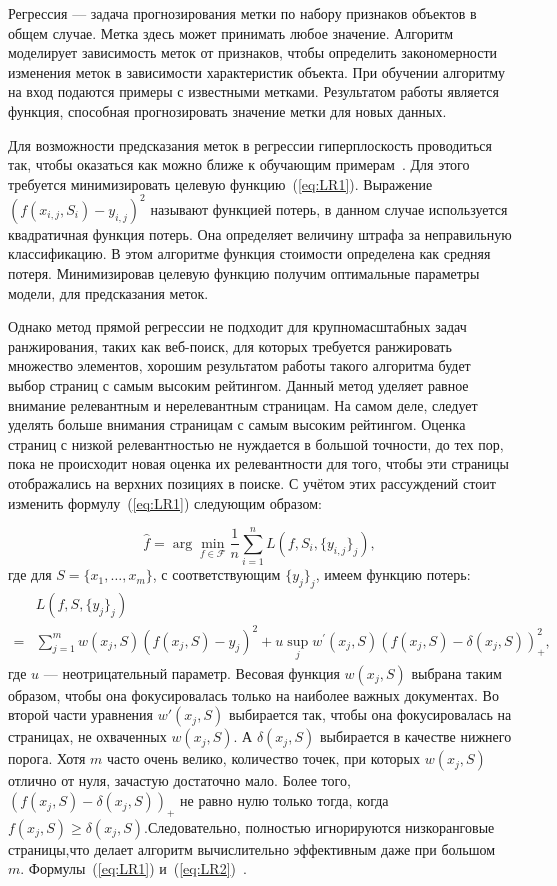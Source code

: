 Регрессия --- задача прогнозирования метки по набору признаков объектов в общем случае. Метка здесь может принимать любое значение. Алгоритм моделирует зависимость меток от признаков, чтобы определить закономерности изменения меток в зависимости характеристик объекта. При обучении алгоритму на вход подаются примеры с известными метками. Результатом работы является функция, способная прогнозировать значение метки для новых данных. 

Для возможности предсказания меток в регрессии гиперплоскость проводиться так, чтобы оказаться как можно ближе к обучающим примерам~\cite{ML_no_wors}. Для этого требуется минимизировать целевую функцию~(\ref{eq:LR1}). Выражение \\$(f(x_{i, j}, S_i)-y_{i, j})^2$ называют функцией потерь, в данном случае используется квадратичная функция потерь. Она определяет величину штрафа за неправильную классификацию. В этом алгоритме функция стоимости определена как средняя потеря. Минимизировав целевую функцию получим оптимальные параметры модели, для предсказания меток.

Однако метод прямой регрессии не подходит для крупномасштабных задач ранжирования, таких как веб-поиск, для которых требуется ранжировать множество элементов, хорошим результатом работы такого алгоритма будет выбор страниц с самым высоким рейтингом. Данный метод уделяет равное внимание релевантным и нерелевантным страницам. На самом деле, следует уделять больше внимания страницам с самым высоким рейтингом. Оценка страниц с низкой релевантностью не нуждается в большой точности, до тех пор, пока не происходит новая оценка их релевантности для того, чтобы эти страницы отображались на верхних позициях в поиске. С учётом этих рассуждений стоит изменить формулу~(\ref{eq:LR1}) следующим образом:
	
{\begin{equation}
			\label{eq:LR2}
		\hat{f}=\arg \min _{f \in \mathcal{F}}
		\frac{1}{n} \sum_{i=1}^n L(f, S_i,\{y_{i, j}\}_j),
\end{equation}}
где для $S = \{x_{1}, \dots, x_{m}\}$, с соответствующим $\{y_{j}\}_{j}$, имеем функцию потерь:
\[
\begin{aligned}
	& L(f, S,\{y_j\}_j) \\
	= & \sum_{j=1}^m w(x_j, S)(f(x_j, S)-y_j)^2+u \sup _j w^{\prime}(x_j, S)(f(x_j, S)-\delta(x_j, S))_{+}^2,
\end{aligned}
\]
где $u$ --- неотрицательный параметр. Весовая функция $w(x_j, S)$ выбрана таким образом, чтобы она фокусировалась только на наиболее важных документах. Во второй части уравнения $w'(x_j, S)$ выбирается так, чтобы она фокусировалась на страницах, не охваченных $w(x_j, S)$.  А $\delta(x_j, S)$ выбирается в качестве нижнего порога. Хотя $m$ часто очень велико, количество точек, при которых $w(x_j, S)$ отлично от нуля, зачастую достаточно мало. Более того, $(f(x_j, S)-\delta(x_j, S))_{+}$ не равно нулю только тогда, когда $f(x_j, S) \geq \delta(x_j, S)$.Следовательно, полностью игнорируются низкоранговые страницы,что делает алгоритм вычислительно эффективным даже при большом $m$. Формулы~(\ref{eq:LR1}) и~(\ref{eq:LR2})~\cite{LR}. 

